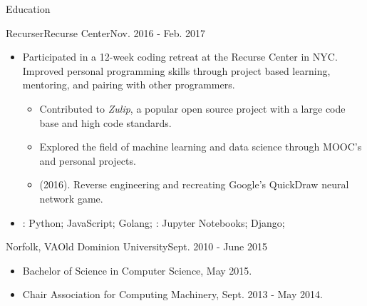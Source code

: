 \documentclass[]{mcdowellcv}
\begin{document}
    \begin{cvsection}{Education}
        \begin{cvsubsection}{Recurser}{Recurse Center}{Nov. 2016 - Feb. 2017}
            \begin{itemize}
                \item Participated in a 12-week coding retreat at the Recurse Center in NYC. Improved personal programming skills through project based learning, mentoring, and pairing with other programmers.
                \begin{itemize}
                    \item Contributed to \textit{Zulip}, a popular open source project with a large code base and high code standards.
                    \item Explored the field of machine learning and data science through MOOC's and personal projects.
                    \item {} (2016). Reverse engineering and recreating Google's QuickDraw neural network game.
                \end{itemize}
            \end{itemize}
            \begin{itemize}
                 \item {}: Python; JavaScript; Golang; \newline
                 : Jupyter Notebooks; Django;
            \end{itemize}
        \end{cvsubsection}
        \begin{cvsubsection}{Norfolk, VA}{Old Dominion University}{Sept. 2010 - June 2015}
            \begin{itemize}
                \item  Bachelor of Science in Computer Science, May 2015.
                \item Chair Association for Computing Machinery, Sept. 2013 - May 2014.
            \end{itemize}
        \end{cvsubsection}
    \end{cvsection}
\end{document}

